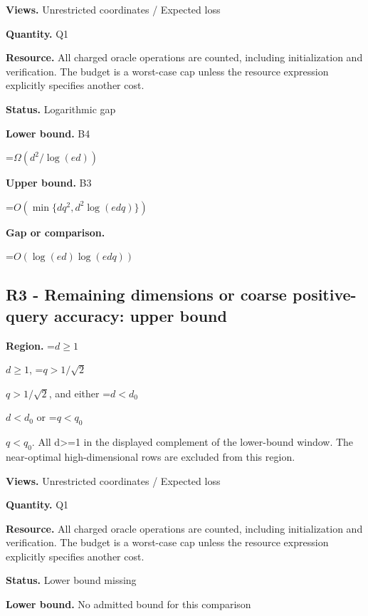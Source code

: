 \documentclass[10pt,a4paper]{article}
\newcommand{\AtlasMath}[1]{\par\begingroup\centering\setbox0=\hbox{$\displaystyle #1$}\ifdim\wd0>1.4\linewidth\typeout{ATLAS WIDE FORMULA: \the\wd0}\fi\ifdim\wd0>\linewidth\resizebox{\linewidth}{!}{\box0}\else\box0\fi\par\endgroup}
\newcommand{\AtlasInlineMath}[1]{\begingroup\setbox0=\hbox{$#1$}\ifdim\wd0>.4\linewidth\endgroup\AtlasMath{#1}\else\endgroup$#1$\fi}
\begin{document}
\textbf{Views.} Unrestricted coordinates / Expected loss



\textbf{Quantity.} Q1



\textbf{Resource.} All charged oracle operations are counted, including initialization and verification. The budget is a worst-case cap unless the resource expression explicitly specifies another cost.



\textbf{Status.} Logarithmic gap



\textbf{Lower bound.} B4



\AtlasMath{\Omega(d^2/\log(ed))}


\textbf{Upper bound.} B3



\AtlasMath{O(\min\{dq^2,d^2\log(edq)\})}


\textbf{Gap or comparison.}



\AtlasMath{O(\log(ed)\log(edq))}


\subsection{R3 - Remaining dimensions or coarse positive-query accuracy: upper bound}


\textbf{Region.} \AtlasInlineMath{d\ge1}, \AtlasInlineMath{q>1/\sqrt2}, and either \AtlasInlineMath{d<d_0} or \AtlasInlineMath{q<q_0}. All d>=1 in the displayed complement of the lower-bound window. The near-optimal high-dimensional rows are excluded from this region.



\textbf{Views.} Unrestricted coordinates / Expected loss



\textbf{Quantity.} Q1



\textbf{Resource.} All charged oracle operations are counted, including initialization and verification. The budget is a worst-case cap unless the resource expression explicitly specifies another cost.



\textbf{Status.} Lower bound missing



\textbf{Lower bound.} No admitted bound for this comparison
\end{document}
